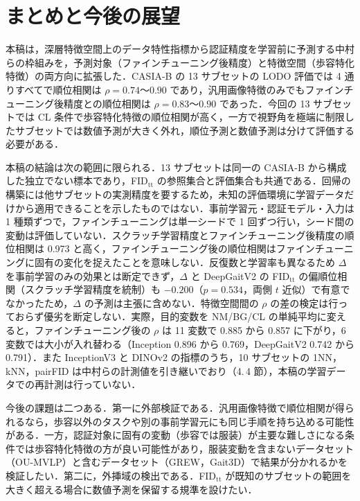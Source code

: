 \documentclass[technicalreport]{ieicej}
\begin{document}
\section{まとめと今後の展望}
本稿は，深層特徴空間上のデータ特性指標から認証精度を学習前に予測する中村らの枠組みを，予測対象（ファインチューニング後精度）と特徴空間（歩容特化特徴）の両方向に拡張した．CASIA-B の 13 サブセットの LODO 評価では 4 通りすべてで順位相関は $\rho=0.74$〜$0.90$ であり，汎用画像特徴のみでもファインチューニング後精度との順位相関は $\rho=0.83$〜$0.90$ であった．今回の 13 サブセットでは CL 条件で歩容特化特徴の順位相関が高く，一方で視野角を極端に制限したサブセットでは数値予測が大きく外れ，順位予測と数値予測は分けて評価する必要がある．

本稿の結論は次の範囲に限られる．13 サブセットは同一の CASIA-B から構成した独立でない標本であり，FID$_{\mathrm{tt}}$ の参照集合と評価集合も共通である．回帰の構築には他サブセットの実測精度を要するため，未知の評価環境に学習データだけから適用できることを示したものではない．事前学習元・認証モデル・入力は 1 種類ずつで，ファインチューニングは単一シードで 1 回ずつ行い，シード間の変動は評価していない．スクラッチ学習精度とファインチューニング後精度の順位相関は 0.973 と高く，ファインチューニング後の順位相関はファインチューニングに固有の変化を捉えたことを意味しない．反復数と学習率も異なるため $\Delta$ を事前学習のみの効果とは断定できず，$\Delta$ と DeepGaitV2 の FID$_{\mathrm{tt}}$ の偏順位相関（スクラッチ学習精度を統制）も $-0.200$（$p=0.534$，両側 $t$ 近似）で有意でなかったため，$\Delta$ の予測は主張に含めない．特徴空間間の $\rho$ の差の検定は行っておらず優劣を断定しない．実際，目的変数を NM/BG/CL の単純平均に変えると，ファインチューニング後の $\rho$ は 11 変数で 0.885 から 0.857 に下がり，6 変数では大小が入れ替わる（Inception 0.896 から 0.769，DeepGaitV2 0.742 から 0.791）．また InceptionV3 と DINOv2 の指標のうち，10 サブセットの 1NN，kNN，pairFID は中村らの計測値を引き継いでおり（4.\,4 節），本稿の学習データでの再計測は行っていない．

今後の課題は二つある．第一に外部検証である．汎用画像特徴で順位相関が得られるなら，歩容以外のタスクや別の事前学習元にも同じ手順を持ち込める可能性がある．一方，認証対象に固有の変動（歩容では服装）が主要な難しさになる条件では歩容特化特徴の方が良い可能性があり，服装変動を含まないデータセット（OU-MVLP\cite{Takemura_OUMVLP}）と含むデータセット（GREW\cite{Zhu_GREW}，Gait3D\cite{Zheng_Gait3D}）で結果が分かれるかを検証したい．第二に，外挿域の検出である．FID$_{\mathrm{tt}}$ が既知のサブセットの範囲を大きく超える場合に数値予測を保留する規準を設けたい．



\end{document}
